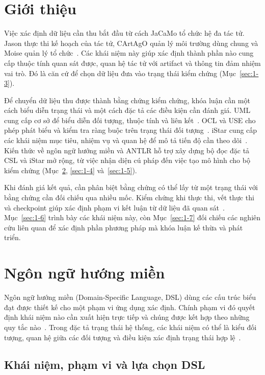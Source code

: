 \documentclass[12pt,a4paper,oneside]{extreport}
\begin{document}
\section{Giới thiệu}\label{sec:1-1}

Việc xác định dữ liệu cần thu bắt đầu từ cách JaCaMo tổ chức hệ đa tác tử. Jason thực thi kế hoạch của tác tử, CArtAgO quản lý môi trường dùng chung và Moise quản lý tổ chức~\cite{ref-2}. Các khái niệm này giúp xác định thành phần nào cung cấp thuộc tính quan sát được, quan hệ tác tử với artifact và thông tin đảm nhiệm vai trò. Đó là căn cứ để chọn dữ liệu đưa vào trạng thái kiểm chứng (Mục~\ref{sec:1-3}).

Để chuyển dữ liệu thu được thành bằng chứng kiểm chứng, khóa luận cần một cách biểu diễn trạng thái và một cách đặc tả các điều kiện cần đánh giá. UML cung cấp cơ sở để biểu diễn đối tượng, thuộc tính và liên kết~\cite{ref-14}. OCL và USE cho phép phát biểu và kiểm tra ràng buộc trên trạng thái đối tượng~\cite{ref-4,ref-15}. iStar cung cấp các khái niệm mục tiêu, nhiệm vụ và quan hệ để mô tả tiến độ cần theo dõi~\cite{ref-12}. Kiến thức về ngôn ngữ hướng miền và ANTLR hỗ trợ xây dựng bộ đọc đặc tả CSL và iStar mở rộng, từ việc nhận diện cú pháp đến việc tạo mô hình cho bộ kiểm chứng (Mục~\ref{sec:1-2}, \ref{sec:1-4} và~\ref{sec:1-5}).

Khi đánh giá kết quả, cần phân biệt bằng chứng có thể lấy từ một trạng thái với bằng chứng cần đối chiếu qua nhiều mốc. Kiểm chứng khi thực thi, vết thực thi và checkpoint giúp xác định phạm vi kết luận từ dữ liệu đã quan sát~\cite{ref-5,ref-23}. Mục~\ref{sec:1-6} trình bày các khái niệm này, còn Mục~\ref{sec:1-7} đối chiếu các nghiên cứu liên quan để xác định phần phương pháp mà khóa luận kế thừa và phát triển.

\section{Ngôn ngữ hướng miền}\label{sec:1-2}

Ngôn ngữ hướng miền (Domain-Specific Language, DSL) dùng các cấu trúc biểu đạt được thiết kế cho một phạm vi ứng dụng xác định. Chính phạm vi đó quyết định khái niệm nào cần xuất hiện trực tiếp và chúng được kết hợp theo những quy tắc nào~\cite{ref-6}. Trong đặc tả trạng thái hệ thống, các khái niệm có thể là kiểu đối tượng, quan hệ giữa các đối tượng và điều kiện xác định trạng thái hợp lệ~\cite{ref-28}.

\subsection{Khái niệm, phạm vi và lựa chọn DSL}\label{sec:1-2-1}
\end{document}
